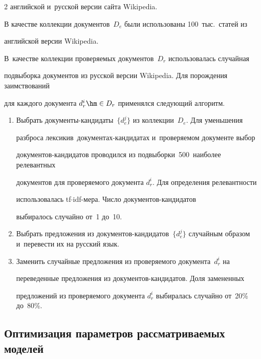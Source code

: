 \begin{multicols}{2}
английской и~русской версии сайта Wikipedia.


В качестве коллекции документов~$D_e$ были использованы 100~тыс.\ статей из 


английской версии Wikipedia.


В~качестве коллекции проверяемых документов~$D_r$ использовалась случайная 


подвыборка документов из русской версии Wikipedia. Для порождения заимствований 


для каждого документа $d_r^i \hm\in D_r$ применялся следующий алгоритм.


\begin{enumerate}


\item Выбрать документы-кан\-ди\-да\-ты~$\{d_e^j\}$ из коллекции~$D_e$. Для уменьшения 


разброса лексики\linebreak в~до\-ку\-мен\-тах-кан\-ди\-да\-тах и~проверяемом до\-ку\-менте выбор 


до\-ку\-мен\-тов-кан\-ди\-да\-тов проводился  из подвыборки~500~наиболее релевантных 


документов для проверяемого документа $d_r^i$. Для определения релевантности 


использовалась tf\;$\cdot$\;idf-ме\-ра. Чис\-ло до\-ку\-мен\-тов-кан\-ди\-да\-тов 


выбиралось случайно от~1 до~10.


\item Выбрать предложения из до\-ку\-мен\-тов-кан\-ди\-да\-тов~$\{d_e^j\}$ случайным образом и~перевести их на русский язык.


\item Заменить случайные предложения из проверяемого документа~$d_r^i$ на 


переведенные предложения из до\-ку\-мен\-тов-кан\-ди\-да\-тов. Доля замененных 


предложений из про\-ве\-ря\-емо\-го документа $d_r^i$ выбиралась случайно от~20\% до~80\%.


\end{enumerate}





\vspace*{-6pt}





\subsection{Оптимизация параметров рассматриваемых моделей}






\end{multicols}
